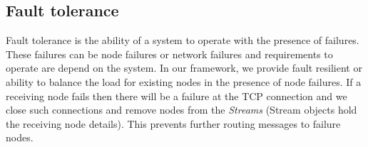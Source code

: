 \subsection{Fault tolerance}
Fault tolerance is the ability of a system to operate with the presence of failures. These failures can be node failures or network failures and requirements to operate are depend on the system. In our framework, we provide fault resilient or ability to balance the load for existing nodes in the presence of node failures. If a receiving node fails then there will be a failure at the TCP connection and we close such connections and remove nodes from the \textit{Streams} (Stream objects hold the receiving node details). This prevents further routing messages to failure nodes.

